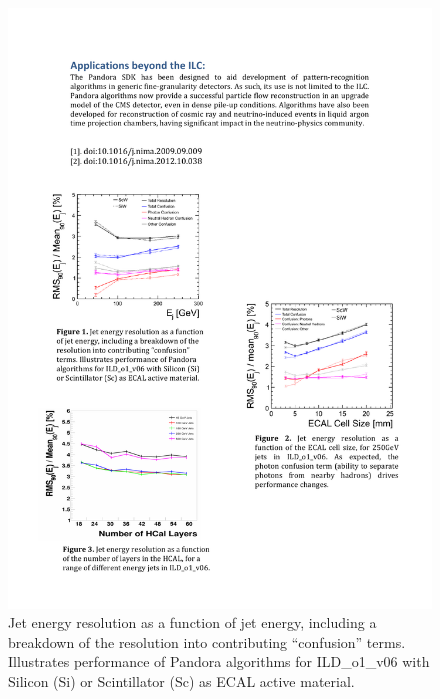 \begin{figure}
\includegraphics{Software/PandoraPFA/JetEnergyResolution}
\caption{Jet energy resolution as a function of jet energy, including a breakdown of the
resolution into contributing “confusion” terms. Illustrates performance of
Pandora algorithms for ILD_o1_v06 with Silicon (Si) or Scintillator (Sc) as ECAL
active material.}
\label{fig:Software:PandoraPFA:JetEnergyResolution}
\end{figure}


